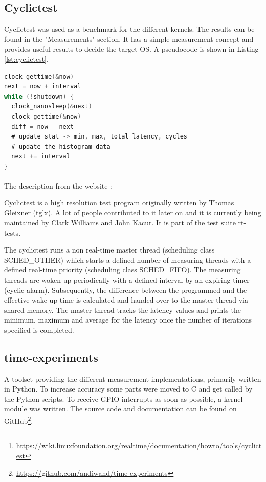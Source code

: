 \subsection{Cyclictest}

Cyclictest was used as a benchmark for the different kernels.\cite{cyclictest} The results can be found in the "Measurements" section. It has a simple measurement concept and provides useful results to decide the target OS. A pseudocode is shown in Listing \ref{lst:cyclictest}.

\begin{lstlisting}[label=lst:cyclictest, language=C, caption=Cyclictest pseudocode]
clock_gettime(&now)
next = now + interval
while (!shutdown) {
  clock_nanosleep(&next)
  clock_gettime(&now)
  diff = now - next
  # update stat -> min, max, total latency, cycles
  # update the histogram data
  next += interval
}
\end{lstlisting}

The description from the website\footnote{\url{https://wiki.linuxfoundation.org/realtime/documentation/howto/tools/cyclictest}}:

\begin{displayquote}
Cyclictest is a high resolution test program originally written by Thomas Gleixner (tglx). A lot of people contributed to it later on and it is currently being maintained by Clark Williams and John Kacur. It is part of the test suite rt-tests.

The cyclictest runs a non real-time master thread (scheduling class SCHED\_OTHER) which starts a defined number of measuring threads with a defined real-time priority (scheduling class SCHED\_FIFO). The measuring threads are woken up periodically with a defined interval by an expiring timer (cyclic alarm). Subsequently, the difference between the programmed and the effective wake-up time is calculated and handed over to the master thread via shared memory. The master thread tracks the latency values and prints the minimum, maximum and average for the latency once the number of iterations specified is completed.
\end{displayquote}

\subsection{time-experiments}

A toolset providing the different measurement implementations, primarily written in Python. To increase accuracy some parts were moved to C and get called by the Python scripts. To receive GPIO interrupts as soon as possible, a kernel module was written. The source code and documentation can be found on GitHub\footnote{\url{https://github.com/andiwand/time-experiments}}.

